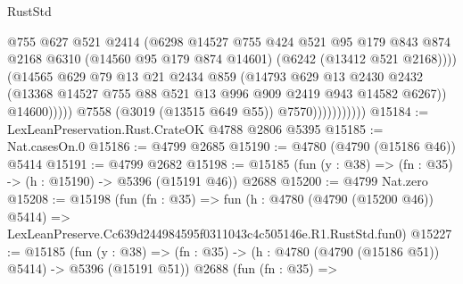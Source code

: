 \begin{lexlean}{RustStd}
\begin{coremodule}
                                    @755
                                    @627
                                    @521
                                    @2414
                                    (@6298
                                      @14527
                                      @755
                                      @424
                                      @521
                                      @95
                                      @179
                                      @843
                                      @874
                                      @2168
                                      @6310
                                      (@14560 @95 @179 @874 @14601)
                                      (@6242 (@13412 @521 @2168))))
                                  (@14565
                                    @629
                                    @79
                                    @13
                                    @21
                                    @2434
                                    @859
                                    (@14793
                                      @629
                                      @13
                                      @2430
                                      @2432
                                      (@13368
                                        @14527
                                        @755
                                        @88
                                        @521
                                        @13
                                        @996
                                        @909
                                        @2419
                                        @943
                                        @14582
                                        @6267))
                                    @14600)))))
                          @7558
                          (@3019 (@13515 @649 @55))
                          @7570)))))))))))
@15184 := LexLeanPreservation.Rust.CrateOK @4788 @2806 @5395
@15185 := Nat.casesOn.{0}
@15186 := @4799 @2685
@15190 := @4780 (@4790 (@15186 @46)) @5414
@15191 := @4799 @2682
@15198 := @15185 (fun (y : @38) => (fn : @35) -> (h : @15190) -> @5396 (@15191 @46)) @2688
@15200 := @4799 Nat.zero
@15208 := @15198
    (fun (fn : @35) =>
    fun (h : @4780 (@4790 (@15200 @46)) @5414) =>
    LexLeanPreserve.Cc639d244984595f0311043c4c505146e.R1.RustStd.fun0)
@15227 := @15185
    (fun (y : @38) => (fn : @35) -> (h : @4780 (@4790 (@15186 @51)) @5414) -> @5396 (@15191 @51))
    @2688
    (fun (fn : @35) =>

\end{coremodule}
\end{lexlean}
